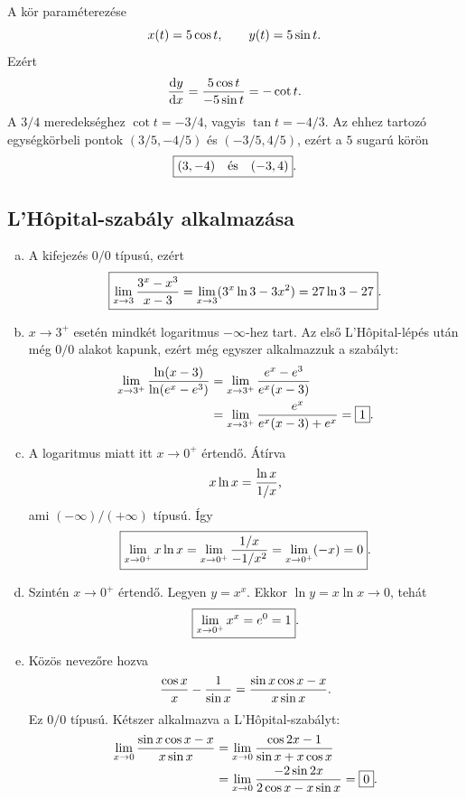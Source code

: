 \documentclass{szb-solution}
\begin{document}
A kör paraméterezése
$$
  x(t)=5\cos t,
  \qquad y(t)=5\sin t
  \text.
$$
Ezért
$$
  \frac{\mathrm dy}{\mathrm dx}
  =\frac{5\cos t}{-5\sin t}=-\cot t
  \text.
$$
A $3/4$ meredekséghez $\cot t=-3/4$, vagyis $\tan t=-4/3$. Az ehhez
tartozó egységkörbeli pontok $(3/5,-4/5)$ és $(-3/5,4/5)$, ezért a
$5$ sugarú körön
$$
  \boxed{(3,-4)\quad\text{és}\quad(-3,4)}
  \text.
$$

\subsection{L'Hôpital-szabály alkalmazása}

\begin{enumerate}[a)]
  \item A kifejezés $0/0$ típusú, ezért
        $$
          \boxed{
          \lim_{x\to3}\frac{3^x-x^3}{x-3}
          =\lim_{x\to3}(3^x\ln3-3x^2)
          =27\ln3-27}
          \text.
        $$

  \item $x\to3^+$ esetén mindkét logaritmus $-\infty$-hez tart. Az első
        L'Hôpital-lépés után még $0/0$ alakot kapunk, ezért még egyszer
        alkalmazzuk a szabályt:
        \begin{align*}
          \lim_{x\to3^+}\frac{\ln(x-3)}{\ln(e^x-e^3)}
          &=\lim_{x\to3^+}\frac{e^x-e^3}{e^x(x-3)}\\
          &=\lim_{x\to3^+}\frac{e^x}{e^x(x-3)+e^x}
          =\boxed{1}
          \text.
        \end{align*}

  \item A logaritmus miatt itt $x\to0^+$ értendő. Átírva
        $$
          x\ln x=\frac{\ln x}{1/x}
          \text,
        $$
        ami $(-\infty)/(+\infty)$ típusú. Így
        $$
          \boxed{
          \lim_{x\to0^+}x\ln x
          =\lim_{x\to0^+}\frac{1/x}{-1/x^2}
          =\lim_{x\to0^+}(-x)=0}
          \text.
        $$

  \item Szintén $x\to0^+$ értendő. Legyen $y=x^x$. Ekkor
        $\ln y=x\ln x\to0$, tehát
        $$
          \boxed{\displaystyle\lim_{x\to0^+}x^x=e^0=1}
          \text.
        $$

  \item Közös nevezőre hozva
        $$
          \frac{\cos x}{x}-\frac1{\sin x}
          =\frac{\sin x\cos x-x}{x\sin x}
          \text.
        $$
        Ez $0/0$ típusú. Kétszer alkalmazva a L'Hôpital-szabályt:
        \begin{align*}
          \lim_{x\to0}\frac{\sin x\cos x-x}{x\sin x}
          &=\lim_{x\to0}\frac{\cos2x-1}{\sin x+x\cos x}\\
          &=\lim_{x\to0}\frac{-2\sin2x}{2\cos x-x\sin x}
          =\boxed{0}
          \text.
        \end{align*}
\end{enumerate}
\end{document}
